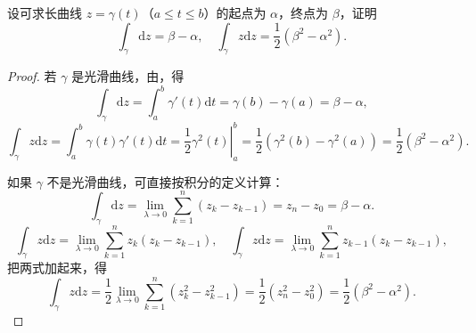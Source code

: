 \documentclass[../../main.tex]{subfiles}%
\begin{document}
\begin{example}\label{example:例3.1.3}
设可求长曲线 \( z = \gamma(t) \)（\( a \leqslant t \leqslant b \)）的起点为 \( \alpha \)，终点为 \( \beta \)，证明
\[
\int_\gamma \mathrm{d}z = \beta - \alpha,
\quad
\int_\gamma z \mathrm{d}z = \frac{1}{2}(\beta^2 - \alpha^2).
\]
\end{example}
\begin{proof}

若 \( \gamma \) 是光滑曲线，由，得
\[
\int_\gamma \mathrm{d}z = \int_a^b \gamma'(t)\mathrm{d}t
= \gamma(b) - \gamma(a)
= \beta - \alpha,
\]
\[
\int_\gamma z \mathrm{d}z = \int_a^b \gamma(t)\gamma'(t)\mathrm{d}t
= \left. \frac{1}{2}\gamma^2(t) \right|_a^b
= \frac{1}{2}(\gamma^2(b) - \gamma^2(a))
= \frac{1}{2}(\beta^2 - \alpha^2).
\]

如果 \( \gamma \) 不是光滑曲线，可直接按积分的定义计算：
\[
\int_\gamma \mathrm{d}z = \lim_{\lambda \to 0} \sum_{k = 1}^n (z_k - z_{k - 1})
= z_n - z_0
= \beta - \alpha.
\]
\[
\int_\gamma z \mathrm{d}z = \lim_{\lambda \to 0} \sum_{k = 1}^n z_k(z_k - z_{k - 1}),
\quad
\int_\gamma z \mathrm{d}z = \lim_{\lambda \to 0} \sum_{k = 1}^n z_{k - 1}(z_k - z_{k - 1}),
\]
把两式加起来，得
\[
\int_\gamma z \mathrm{d}z = \frac{1}{2} \lim_{\lambda \to 0} \sum_{k = 1}^n (z_k^2 - z_{k - 1}^2)
= \frac{1}{2}(z_n^2 - z_0^2)
= \frac{1}{2}(\beta^2 - \alpha^2).
\]

\end{proof}
\end{document}
